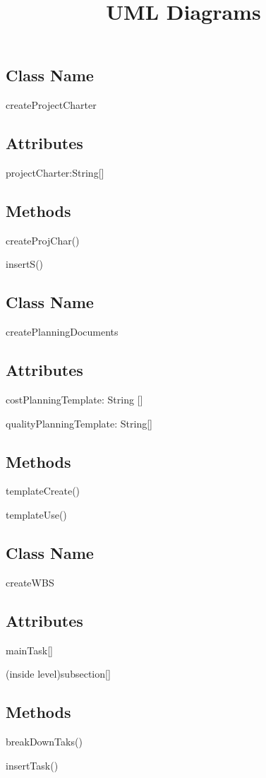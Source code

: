 \documentclass[10pt]{article}
\begin{document}
\newpage
\title{UML Diagrams}
\hline
\subsection{Class Name}
    \item createProjectCharter
\subsection{Attributes}
    \item projectCharter:String[]
\subsection{Methods}
    \item createProjChar()
        \item insertS()\hfill\break

\subsection{Class Name}
    \item createPlanningDocuments
\subsection{ Attributes}
    \item costPlanningTemplate: String []
    \item qualityPlanningTemplate: String[]
\subsection{Methods}
    \item templateCreate()
    \item templateUse()\\

\subsection{Class Name}
    \item createWBS
\subsection{Attributes}
    \item mainTask[]
    \item (inside level)subsection[]
\subsection{Methods}
    \item breakDownTaks()
    \item insertTask()
\end{document}
